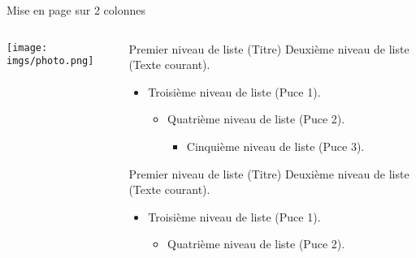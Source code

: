 \documentclass[A4,svgnames,9pt,aspectratio=169]{beamer}
\begin{document}
\begin{frame}{Mise en page sur 2 colonnes}
  \begin{columns}
      
      \begin{column}[t]{0.45\textwidth}
          \begin{center}
          \texttt{[image: imgs/photo.png]}      
          \end{center}
      \end{column}
        
    \begin{column}[t]{0.45\textwidth}

           \begin{block}{Premier niveau de liste (Titre)}
           Deuxième niveau de liste (Texte courant).
             \begin{itemize}
               \item Troisième niveau de liste (Puce 1).
                   \begin{itemize}
                     \item Quatrième niveau de liste (Puce 2).
                        \begin{itemize}
                           \item Cinquième niveau de liste (Puce 3).
                        \end{itemize}
                   \end{itemize}
             \end{itemize}
           \end{block}

           \begin{block}{Premier niveau de liste (Titre)}
           Deuxième niveau de liste (Texte courant).
             \begin{itemize}
               \item Troisième niveau de liste (Puce 1).
                   \begin{itemize}
                     \item Quatrième niveau de liste (Puce 2).
                   \end{itemize}
             \end{itemize}
           \end{block}

         \end{column}
         
  \end{columns}
\end{frame}
\end{document}
